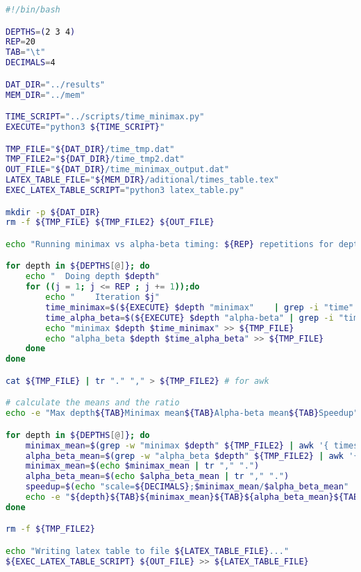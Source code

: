 \documentclass{article}
\begin{document}
\begin{lstlisting}[language=bash, caption = Complete description of the tests carried out (\emph{time\_minimax.sh}),captionpos=t]
#!/bin/bash

DEPTHS=(2 3 4)
REP=20
TAB="\t"
DECIMALS=4

DAT_DIR="../results"
MEM_DIR="../mem"

TIME_SCRIPT="../scripts/time_minimax.py"
EXECUTE="python3 ${TIME_SCRIPT}"

TMP_FILE="${DAT_DIR}/time_tmp.dat"
TMP_FILE2="${DAT_DIR}/time_tmp2.dat"
OUT_FILE="${DAT_DIR}/time_minimax_output.dat"
LATEX_TABLE_FILE="${MEM_DIR}/aditional/times_table.tex"
EXEC_LATEX_TABLE_SCRIPT="python3 latex_table.py"

mkdir -p ${DAT_DIR}
rm -f ${TMP_FILE} ${TMP_FILE2} ${OUT_FILE}

echo "Running minimax vs alpha-beta timing: ${REP} repetitions for depths {${DEPTHS[@]}}"

for depth in ${DEPTHS[@]}; do
    echo "  Doing depth $depth"
    for ((j = 1; j <= REP ; j += 1));do
        echo "    Iteration $j"
        time_minimax=$(${EXECUTE} $depth "minimax"    | grep -i "time" | awk '{print $2}' )
        time_alpha_beta=$(${EXECUTE} $depth "alpha-beta" | grep -i "time" | awk '{print $2}' )
        echo "minimax $depth $time_minimax" >> ${TMP_FILE}
        echo "alpha_beta $depth $time_alpha_beta" >> ${TMP_FILE}
    done
done

cat ${TMP_FILE} | tr "." "," > ${TMP_FILE2} # for awk 

# calculate the means and the ratio
echo -e "Max depth${TAB}Minimax mean${TAB}Alpha-beta mean${TAB}Speedup" >> ${OUT_FILE}

for depth in ${DEPTHS[@]}; do
    minimax_mean=$(grep -w "minimax $depth" ${TMP_FILE2} | awk '{ times += $3; n++ } END { printf "%s", times/n }')
    alpha_beta_mean=$(grep -w "alpha_beta $depth" ${TMP_FILE2} | awk '{ times += $3; n++ } END { printf "%s", times/n }')
    minimax_mean=$(echo $minimax_mean | tr "," ".")
    alpha_beta_mean=$(echo $alpha_beta_mean | tr "," ".")
    speedup=$(echo "scale=${DECIMALS};$minimax_mean/$alpha_beta_mean" | bc)
    echo -e "${depth}${TAB}${minimax_mean}${TAB}${alpha_beta_mean}${TAB}${speedup}" >> ${OUT_FILE}
done

rm -f ${TMP_FILE2}

echo "Writing latex table to file ${LATEX_TABLE_FILE}..."
${EXEC_LATEX_TABLE_SCRIPT} ${OUT_FILE} >> ${LATEX_TABLE_FILE} 

\end{lstlisting}
\end{document}
